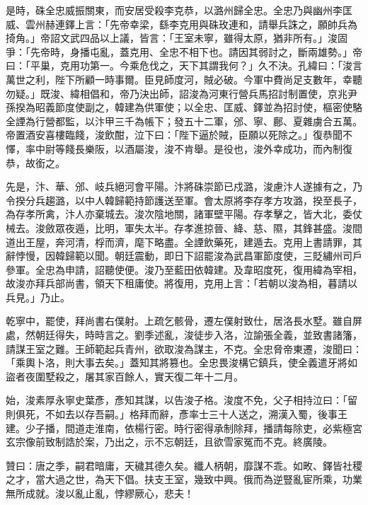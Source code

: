 \begin{pinyinscope}
 是時，硃全忠威振關東，而安居受殺李克恭，以潞州歸全忠。全忠乃與幽州李匡威、雲州赫連鐸上言：「先帝幸梁，繇李克用與硃玫連和，請舉兵誅之，願帥兵為掎角。」帝詔文武四品以上議，皆言：「王室未寧，雖得太原，猶非所有。」浚固爭：「先帝時，身播屯亂，蓋克用、全忠不相下也。請因其弱討之，斷兩雄勢。」帝曰：「平巢，克用功第一。今乘危伐之，天下其謂我何？」久不決。孔緯曰：「浚言萬世之利，陛下所顧一時事爾。臣見師度河，賊必破。今軍中費尚足支數年，幸聽勿疑。」既浚、緯相倡和，帝乃決出師，詔浚為河東行營兵馬招討制置使，京兆尹孫揆為昭義節度使副之，韓建為供軍使；以全忠、匡威、鐸並為招討使，樞密使駱全諲為行營都監，以汴甲三千為帳下；發五十二軍，邠、寧、鄜、夏雜虜合五萬。帝置酒安喜樓臨餞，浚飲酣，泣下曰：「陛下逼於賊，臣願以死除之。」復恭聞不懌，率中尉等餞長樂阪，以酒屬浚，浚不肯舉。是役也，浚外幸成功，而內制復恭，故銜之。



 先是，汴、華、邠、岐兵絕河會平陽。汴將硃崇節已戍潞，浚慮汴人遂據有之，乃令揆分兵趨潞，以中人韓歸範持節護送至軍。會太原將李存孝方攻潞，揆至長子，為存孝所禽，汴人亦棄城去。浚次陰地關，諸軍壁平陽。存孝擊之，皆大北，委仗械去。浚斂眾夜遁，比明，軍失太半。存孝進掠晉、絳、慈、隰，其鋒甚盛。浚間道出王屋，奔河清，桴而濟，麾下略盡。全諲飲藥死，建遁去。克用上書請罪，其辭悖慢，因韓歸範以聞。朝廷震動，即日下詔罷浚為武昌軍節度使，三貶繡州司戶參軍。全忠為申請，詔聽使便。浚乃至藍田依韓建。及韋昭度死，復用緯為宰相，故浚亦拜兵部尚書，領天下租庸使。將復用，克用上言：「若朝以浚為相，暮請以兵見。」乃止。



 乾寧中，罷使，拜尚書右僕射。上疏乞骸骨，遷左僕射致仕，居洛長水墅。雖自屏處，然朝廷得失，時時言之。劉季述亂，浚徒步入洛，泣諭張全義，並致書諸籓，請謀王室之難。王師範起兵青州，欲取浚為謀主，不克。全忠脅帝東遷，浚聞曰：「乘輿卜洛，則大事去矣。」蓋知其將篡也。全忠畏浚構它鎮兵，使全義遣牙將如盜者夜圍墅殺之，屠其家百餘人，實天復二年十二月。



 始，浚素厚永寧史葉彥，彥知其謀，以告浚子格。浚度不免，父子相持泣曰：「留則俱死，不如去以存吾嗣。」格拜而辭，彥率士三十人送之，溯漢入蜀，後事王建。少子播，間道走淮南，依楊行密。時行密得承制除拜，播請每除吏，必紫極宮玄宗像前致制誥於案，乃出之，示不忘朝廷，且欲雪家冤而不克。終廣陵。



 贊曰：唐之季，嗣君暗庸，天穢其德久矣。纖人柄朝，靡謀不乖。如畋、鐸皆社稷之才，當大過之世，為天下倡。扶支王室，幾致中興。俄而為逆豎亂宦所乘，功業無所成就。浚以亂止亂，悖繆厥心，悲夫！



\end{pinyinscope}